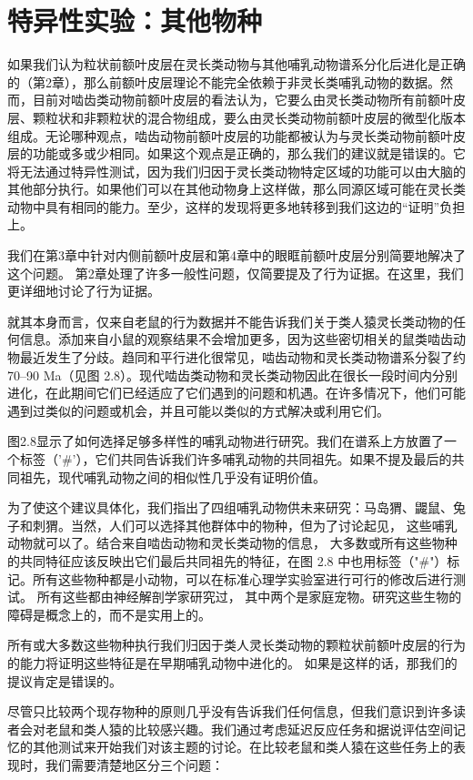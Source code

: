 \section{特异性实验：其他物种}
如果我们认为粒状前额叶皮层在灵长类动物与其他哺乳动物谱系分化后进化是正确的（第2章），那么前额叶皮层理论不能完全依赖于非灵长类哺乳动物的数据。然而，目前对啮齿类动物前额叶皮层的看法认为，它要么由灵长类动物所有前额叶皮层、颗粒状和非颗粒状的混合物组成，要么由灵长类动物前额叶皮层的微型化版本组成。无论哪种观点，啮齿动物前额叶皮层的功能都被认为与灵长类动物前额叶皮层的功能或多或少相同。如果这个观点是正确的，那么我们的建议就是错误的。它将无法通过特异性测试，因为我们归因于灵长类动物特定区域的功能可以由大脑的其他部分执行。如果他们可以在其他动物身上这样做，那么同源区域可能在灵长类动物中具有相同的能力。至少，这样的发现将更多地转移到我们这边的“证明”负担上。
\par 
我们在第3章中针对内侧前额叶皮层和第4章中的眼眶前额叶皮层分别简要地解决了这个问题。 
第2章处理了许多一般性问题，仅简要提及了行为证据。在这里，我们更详细地讨论了行为证据。
\par 
就其本身而言，仅来自老鼠的行为数据并不能告诉我们关于类人猿灵长类动物的任何信息。添加来自小鼠的观察结果不会增加更多，因为这些密切相关的鼠类啮齿动物最近发生了分歧。趋同和平行进化很常见，啮齿动物和灵长类动物谱系分裂了约 70–90 Ma（见图 2.8）。现代啮齿类动物和灵长类动物因此在很长一段时间内分别进化，在此期间它们已经适应了它们遇到的问题和机遇。在许多情况下，他们可能遇到过类似的问题或机会，并且可能以类似的方式解决或利用它们。
\par 
图2.8显示了如何选择足够多样性的哺乳动物进行研究。我们在谱系上方放置了一个标签（'$\#$'），它们共同告诉我们许多哺乳动物的共同祖先。如果不提及最后的共同祖先，现代哺乳动物之间的相似性几乎没有证明价值。
\par 
为了使这个建议具体化，我们指出了四组哺乳动物供未来研究：马岛猬、鼹鼠、兔子和刺猬。当然，人们可以选择其他群体中的物种，但为了讨论起见， 这些哺乳动物就可以了。结合来自啮齿动物和灵长类动物的信息， 大多数或所有这些物种的共同特征应该反映出它们最后共同祖先的特征，在图 2.8 中也用标签（"$\#$"）标记。所有这些物种都是小动物，可以在标准心理学实验室进行可行的修改后进行测试。 所有这些都由神经解剖学家研究过， 其中两个是家庭宠物。研究这些生物的障碍是概念上的，而不是实用上的。
\par 
所有或大多数这些物种执行我们归因于类人灵长类动物的颗粒状前额叶皮层的行为的能力将证明这些特征是在早期哺乳动物中进化的。 
如果是这样的话，那我们的提议肯定是错误的。
\par 
尽管只比较两个现存物种的原则几乎没有告诉我们任何信息，但我们意识到许多读者会对老鼠和类人猿的比较感兴趣。我们通过考虑延迟反应任务和据说评估空间记忆的其他测试来开始我们对该主题的讨论。在比较老鼠和类人猿在这些任务上的表现时，我们需要清楚地区分三个问题：

